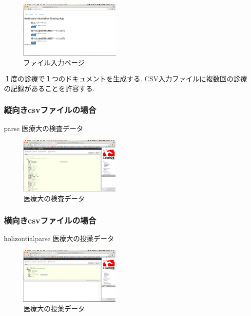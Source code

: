 	\begin{figure}[htbp]
			\includegraphics[width=5cm, bb=0 0 437 688]{./gazou/fileiopage.png}
		\caption{ファイル入力ページ}
		\label{fileiopage}
	\end{figure}

	１度の診療で１つのドキュメントを生成する.
	CSV入力ファイルに複数回の診療の記録があることを許容する.

		\subsubsection{縦向きcsvファイルの場合}
			parse
			医療大の検査データ
			\\
			\begin{figure}[htbp]
					\includegraphics[width=5cm, bb=0 0 437 688]{./gazou/kensa.png}
				\caption{医療大の検査データ}
				\label{iryoudai-kensa-data}
			\end{figure}

		\subsubsection{横向きcsvファイルの場合}
			holizontialparse
			医療大の投薬データ
			\\
			\begin{figure}[htbp]
					\includegraphics[width=5cm, bb=0 0 437 688]{./gazou/touyaku.png}
				\caption{医療大の投薬データ}
				\label{iryoudai-touyaku-data}
			\end{figure}

